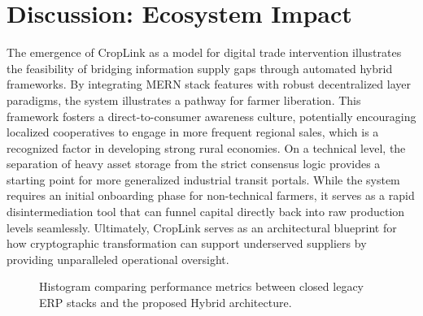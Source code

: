 \documentclass[conference]{IEEEtran}
\begin{document}
\section{Discussion: Ecosystem Impact}
The emergence of CropLink as a model for digital trade intervention illustrates the feasibility of bridging information supply gaps through automated hybrid frameworks. By integrating MERN stack features with robust decentralized layer paradigms, the system illustrates a pathway for farmer liberation. This framework fosters a direct-to-consumer awareness culture, potentially encouraging localized cooperatives to engage in more frequent regional sales, which is a recognized factor in developing strong rural economies. On a technical level, the separation of heavy asset storage from the strict consensus logic provides a starting point for more generalized industrial transit portals. While the system requires an initial onboarding phase for non-technical farmers, it serves as a rapid disintermediation tool that can funnel capital directly back into raw production levels seamlessly. Ultimately, CropLink serves as an architectural blueprint for how cryptographic transformation can support underserved suppliers by providing unparalleled operational oversight.

\begin{figure}[!t]
\centering
{}
\caption{Histogram comparing performance metrics between closed legacy ERP stacks and the proposed Hybrid architecture.}
\label{fig:model_histogram}
\end{figure}
\end{document}
